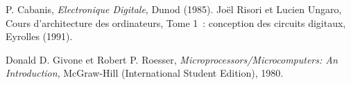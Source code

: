 \begin{thebibliography}{99}

 P. Cabanis, {\em Electronique Digitale}, Dunod (1985).
 Jo\"el Risori et Lucien Ungaro,
	{Cours d'architecture des ordinateurs, Tome 1~: conception
	des circuits digitaux},
	Eyrolles (1991).

 Donald D. Givone et Robert P. Roesser,
{\em Microprocessors/Microcomputers: An Introduction},
McGraw-Hill (International Student Edition), 1980.

\end{thebibliography}

